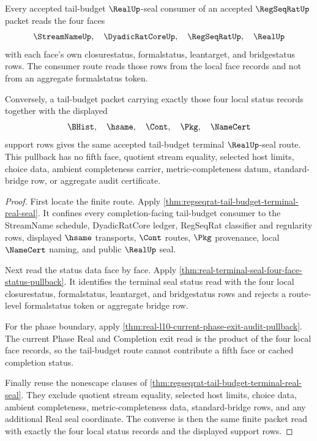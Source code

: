 \begin{theorem}
\label{thm:regseqrat-tail-budget-facewise-status-pullback}
Every accepted tail-budget $\RealUp$-seal consumer of an accepted
$\RegSeqRatUp$ packet reads the four faces
$$
\StreamNameUp,\quad \DyadicRatCoreUp,\quad \RegSeqRatUp,\quad \RealUp
$$
with each face's own closurestatus, formalstatus, leantarget, and bridgestatus
rows. The consumer route reads those rows from the local face records and not
from an aggregate formalstatus token.

Conversely, a tail-budget packet carrying exactly those four local status
records together with the displayed
$$
\BHist,\quad \hsame,\quad \Cont,\quad \Pkg,\quad \NameCert
$$
support rows gives the same accepted tail-budget terminal $\RealUp$-seal route.
This pullback has no fifth face, quotient stream equality, selected host
limits, choice data, ambient completeness carrier, metric-completeness datum,
standard-bridge row, or aggregate audit certificate.
\end{theorem}
\begin{proof}
First locate the finite route. Apply
\autoref{thm:regseqrat-tail-budget-terminal-real-seal}. It confines every
completion-facing tail-budget consumer to the StreamName schedule,
DyadicRatCore ledger, RegSeqRat classifier and regularity rows, displayed
$\hsame$ transports, $\Cont$ routes, $\Pkg$ provenance, local $\NameCert$
naming, and public $\RealUp$ seal.

Next read the status data face by face. Apply
\autoref{thm:real-terminal-seal-four-face-status-pullback}. It identifies the
terminal seal status read with the four local closurestatus, formalstatus,
leantarget, and bridgestatus rows and rejects a route-level formalstatus token
or aggregate bridge row.

For the phase boundary, apply
\autoref{thm:real-l10-current-phase-exit-audit-pullback}. The current Phase
Real and Completion exit read is the product of the four local face records, so
the tail-budget route cannot contribute a fifth face or cached completion
status.

Finally reuse the nonescape clauses of
\autoref{thm:regseqrat-tail-budget-terminal-real-seal}. They exclude quotient
stream equality, selected host limits, choice data, ambient completeness,
metric-completeness data, standard-bridge rows, and any additional Real seal
coordinate. The converse is then the same finite packet read with exactly the
four local status records and the displayed support rows.
\end{proof}

